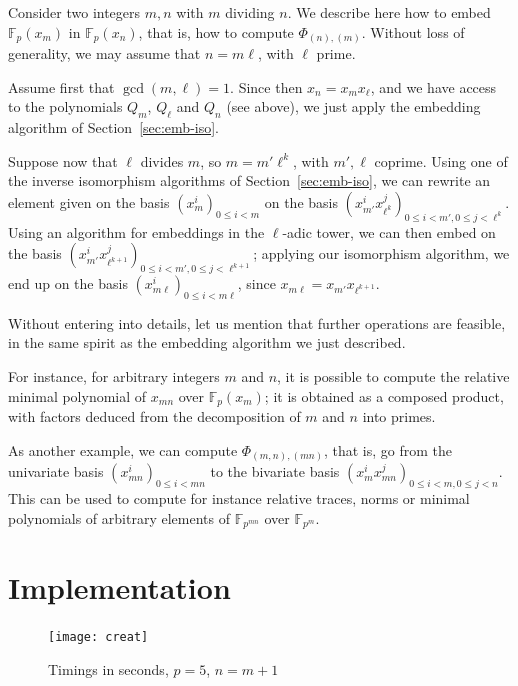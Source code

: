 \documentclass{sig-alternate}
\def\F {\ensuremath{\mathbb{F}}}
\newcounter{algo}
\begin{document}
\smallskip{} Consider two integers $m,n$
with $m$ dividing $n$. We describe here how to embed $\F_p(x_m)$ in
$\F_p(x_n)$, that is, how to compute $\Phi_{(n),(m)}$. Without loss of
generality, we may assume that $n = m\ell$, with $\ell$ prime.

Assume first that $\gcd(m,\ell)=1$. Since then $x_n = x_m x_\ell$, and
we have access to the polynomials $Q_m$, $Q_\ell$ and $Q_n$ (see
above), we just apply the embedding algorithm of
Section~\ref{sec:emb-iso}.

Suppose now that $\ell$ divides $m$, so $m=m'\ell^k$, with $m',\ell$
coprime. Using one of the inverse isomorphism algorithms of
Section~\ref{sec:emb-iso}, we can rewrite an element given on the
basis $(x_m^i)_{0 \le i < m}$ on the basis $(x_{m'}^i x_{\ell^k}^j)_{0
  \le i < m', 0 \le j < \ell^k}$. Using an algorithm for embeddings in
the $\ell$-adic tower, we can then embed on the basis $(x_{m'}^i
x_{\ell^{k+1}}^j)_{0 \le i < m', 0 \le j < \ell^{k+1}}$; applying our
isomorphism algorithm, we end up on the basis $(x_{m\ell}^i)_{0 \le i
  < m \ell}$, since $x_{m \ell} = x_{m'} x_{\ell^{k+1}}$.

\smallskip{}  Without entering
into details, let us mention that further operations are feasible, in
the same spirit as the embedding algorithm we just described.

For instance, for arbitrary integers $m$ and $n$, it is possible to
compute the relative minimal polynomial of $x_{mn}$ over $\F_p(x_m)$; it
is obtained as a composed product, with factors deduced from the
decomposition of $m$ and $n$ into primes.

As another example, we can compute $\Phi_{(m,n),(mn)}$, that is, go
from the univariate basis $(x_{mn}^i)_{0 \le i < mn}$ to the bivariate
basis \sloppy $(x_m^i x_{mn}^j)_{0 \le i < m, 0 \le j < n}$. This can
be used to compute for instance relative traces, norms or minimal
polynomials of arbitrary elements of $\F_{p^{mn}}$ over $\F_{p^m}$.


\section{Implementation}\label{sec:implem}

\begin{figure}
  \centering
  \texttt{[image: creat]}
  \vspace{-6ex}
  \caption{Timings in seconds, $p=5$, $n=m+1$}
  \label{fig:bench}
\vspace{-4ex}
\end{figure}
\end{document}

